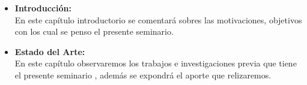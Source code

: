 \begin{itemize}

\item \textbf{Introducción:} \\
En este capítulo introductorio se comentará sobres las motivaciones, objetivos con los cual se penso el presente seminario.

\item \textbf{Estado del Arte:} \\
En este capítulo observaremos los trabajos e investigaciones previa que tiene el presente seminario , además se expondrá el aporte que relizaremos.



\end{itemize}



